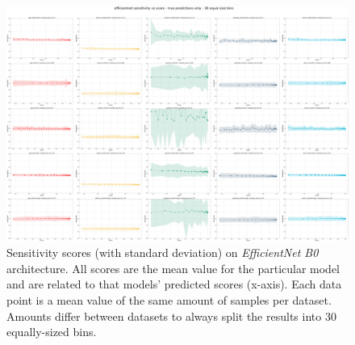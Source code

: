 \begin{figure}[ht]
  \centering
    \includegraphics[width=\textwidth]{results/metrics/efficientnet-sensitivity vs score - true predictions only - 30 equal size bins.png}
    \caption{Sensitivity scores (with standard deviation) on \textit{EfficientNet B0} architecture. All scores are the mean value for the particular model and are related to that models' predicted scores (x-axis). Each data point is a mean value of the same amount of samples per dataset. Amounts differ between datasets to always split the results into 30 equally-sized bins.}\label{fig:efficientnet-sens-std}
\end{figure}
